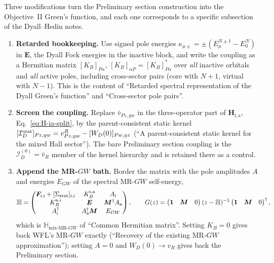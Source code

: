\documentclass[11pt,a4paper]{article}
\newcommand{\bH}{\boldsymbol{H}}
\newcommand{\bM}{\boldsymbol{M}}
\newcommand{\bE}{\boldsymbol{E}}
\newcommand{\bF}{\boldsymbol{F}}
\newcommand{\bbH}{\mathbb{H}}
\newcommand{\MRGW}{MR-$GW$}
\newcommand{\WFL}{WFL}
\newcommand{\Pre}{Preliminary section}
\newcommand{\DHN}{Dyall--Hedin notes}
\begin{document}
Three modifications turn the \Pre{} construction into the Objective~II Green's
function, and each one corresponds to a specific subsection of the \DHN{}.
\begin{enumerate}[leftmargin=2em]
\item \textbf{Retarded bookkeeping.}  Use signed pole energies
  $\kappa_{\mu\pm}=\pm(E^{N\pm1}_\mu-E^N_0)$ in $\bE$, the Dyall Fock energies
  in the inactive block, and write the coupling as a Hermitian matrix
  $[K_B]_{P\alpha}$, $[K_B]_{\alpha P}=[K_B]_{P\alpha}^*$ over \emph{all}
  inactive orbitals and \emph{all} active poles, including cross-sector pairs
  (core with $N+1$, virtual with $N-1$).  This is the content of
  ``Retarded spectral representation of the Dyall Green's function'' and
  ``Cross-sector pole pairs''.
\item \textbf{Screen the coupling.}  Replace $\bar v_{Pz,yw}$ in the
  three-operator part of $\bH_{\mathrm{i,a}}$, Eq.~\eqref{eq:H-ia-split}, by
  the parent-consistent static kernel
  $[\mathcal I_D^{\rm stat}]_{Pz,yw}=v^R_{Pz,yw}-[W_D(0)]_{Pw,yz}$
  (``A parent-consistent static kernel for the mixed Hall sector'').  The bare
  \Pre{} coupling is the $\mathcal I_D^{(0)}=\bar v_R$ member of the kernel
  hierarchy and is retained there as a control.
\item \textbf{Append the \MRGW{} bath.}  Border the matrix with the pole
  amplitudes $A$ and energies $E_{GW}$ of the spectral \MRGW{} self-energy,
  \begin{equation}
    \bbH
    =
    \begin{pmatrix}
      \bF_{\mathrm{i,i}}+[\Sigma_{\rm stat}]_{\mathrm{i,i}} & K_B^{\mathrm{i,a}} & A_{\mathrm i}\\
      K_B^{\mathrm{a,i}} & \bE & \bM^\dagger A_{\mathrm a}\\
      A_{\mathrm i}^\dagger & A_{\mathrm a}^\dagger\bM & E_{GW}
    \end{pmatrix},
    \qquad
    G(z)=\begin{pmatrix}\mathbf 1&\bM&0\end{pmatrix}(z-\bbH)^{-1}\begin{pmatrix}\mathbf 1&\bM&0\end{pmatrix}^{\dagger},
  \end{equation}
  which is $\bbH_{\text{mix-MR-}GW}$ of ``Common Hermitian matrix''.  Setting
  $K_B=0$ gives back \WFL{}'s \MRGW{} exactly (``Recovery of the existing
  \MRGW{} approximation''); setting $A=0$ and $W_D(0)\to v_R$ gives back the
  \Pre{}.
\end{enumerate}
\end{document}
